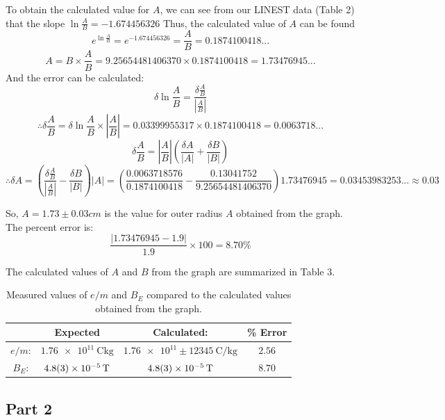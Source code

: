 \documentclass[letterpaper]{article}
\begin{document}
\noindent To obtain the calculated value for $A$, we can see from our LINEST data (Table 2) that the slope $\ln{\frac{A}{B}}=-1.674456326$
Thus, the calculated value of $A$ can be found
$$ e^{\ln{\frac{A}{B}}}=e^{-1.674456326} = \frac{A}{B} = 0.1874100418... $$
$$ A= B \times \frac{A}{B} = 9.25654481406370 \times 0.1874100418 = 1.73476945...$$
And the error can be calculated:
$$ \delta \ln{\frac{A}{B}} =\frac{\delta{\frac{A}{B}}}{|\frac{A}{B}|}  $$
$$ \therefore \delta \frac{A}{B} = \delta \ln{\frac{A}{B}} \times \left|{\frac{A}{B}}\right| = 0.03399955317 \times 0.1874100418 = 0.0063718...$$
$$ \delta \frac{A}{B} = \left|\frac{A}{B}\right|\left(\frac{\delta A}{|A|}+\frac{\delta B}{|B|}\right) $$
$$ \therefore \delta A = \left(\frac{\delta \frac{A}{B}}{|\frac{A}{B}|} - \frac{\delta B}{|B|} \right)|A| = \left( \frac{0.0063718576}{0.1874100418} - \frac{0.13041752}{9.25654481406370} \right)
 1.73476945 = 0.03453983253...\approx 0.03$$

\noindent So, $A=1.73 \pm 0.03 cm$ is the value for outer radius $A$ obtained from the graph.
The percent error is:
$$ \frac{|1.73476945-1.9|}{1.9}\times100 = 8.70\%$$

\vspace{1cm}
\noindent The calculated values of $A$ and $B$ from the graph are summarized in Table 3.
\begin{table}[H]
\centering
\begin{tabular}{c|c|c|c|}
                & Expected                      & Calculated:                                     & \% Error \\ \hline
$e/m$: & $\SI{1.76e11}{\coulomb\kilogram}$      & $\num{1.76e11} \pm \SI{12345}{\coulomb\per\kilogram}$  &    $2.56$  \\ \hline
$B_E$: & $\SI{4.8\pm 0.3e-5}{\tesla}$           & $\SI{4.8\pm 0.3e-5}{\tesla}$                    &   $8.70$  \\ \hline
\end{tabular}
\caption{Measured values of $e/m$ and $B_E$ compared to the calculated values obtained from the graph.}
\end{table}

\subsection{Part 2}
\end{document}
